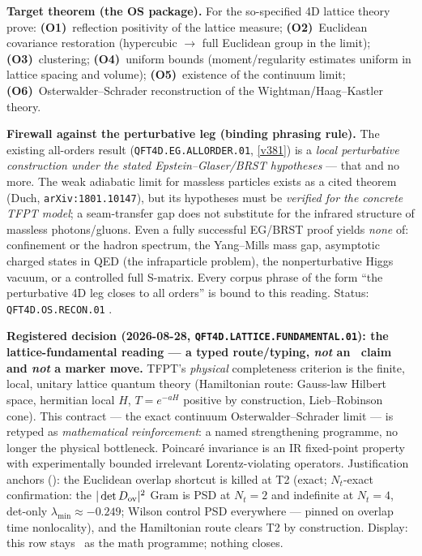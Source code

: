 \documentclass[11pt,a4paper]{article}
\begin{document}
\par\smallskip\noindent\textbf{Target theorem (the OS package).}  For the so-specified 4D
lattice theory prove: \textbf{(O1)}~reflection positivity of the lattice measure;
\textbf{(O2)}~Euclidean covariance restoration (hypercubic $\to$ full Euclidean group in the
limit); \textbf{(O3)}~clustering; \textbf{(O4)}~uniform bounds (moment/regularity estimates
uniform in lattice spacing and volume); \textbf{(O5)}~existence of the continuum limit;
\textbf{(O6)}~Osterwalder--Schrader reconstruction of the Wightman/Haag--Kastler theory.

\par\smallskip\noindent\textbf{Firewall against the perturbative leg (binding phrasing rule).}
The existing all-orders result (\texttt{QFT4D.EG.ALLORDER.01}, \vref{v381}) is a \emph{local
perturbative construction under the stated Epstein--Glaser/BRST hypotheses} --- that and no
more.  The weak adiabatic limit for massless particles exists as a cited theorem (Duch,
\texttt{arXiv:1801.10147}), but its hypotheses must be \emph{verified for the concrete TFPT
model}; a seam-transfer gap does not substitute for the infrared structure of massless
photons/gluons.  Even a fully successful EG/BRST proof yields \emph{none} of: confinement or the
hadron spectrum, the Yang--Mills mass gap, asymptotic charged states in QED (the infraparticle
problem), the nonperturbative Higgs vacuum, or a controlled full S-matrix.  Every corpus phrase
of the form ``the perturbative 4D leg closes to all orders'' is bound to this reading.
Status: \texttt{QFT4D.OS.RECON.01} \mO.

\par\smallskip\noindent\textbf{Registered decision (2026-08-28,
\texttt{QFT4D.LATTICE.FUNDAMENTAL.01}): the lattice-fundamental reading --- a typed
route/typing, \emph{not} an \mE\ claim and \emph{not} a marker move.}
TFPT's \emph{physical} completeness criterion is the finite, local, unitary lattice quantum
theory (Hamiltonian route: Gauss-law Hilbert space, hermitian local $H$, $T=e^{-aH}$ positive
by construction, Lieb--Robinson cone).  This contract --- the exact continuum
Osterwalder--Schrader limit --- is retyped as \emph{mathematical reinforcement}: a named
strengthening programme, no longer the physical bottleneck.  Poincar\'e invariance is an IR
fixed-point property with experimentally bounded irrelevant Lorentz-violating operators.
Justification anchors ():
the Euclidean overlap shortcut is killed at T2 (exact; $N_t$-exact confirmation: the
$|\det D_{\rm ov}|^2$ Gram is PSD at $N_t=2$ and indefinite at $N_t=4$, det-only
$\lambda_{\min}\approx-0.249$; Wilson control PSD everywhere --- pinned on overlap time
nonlocality), and the Hamiltonian route clears T2 by construction.  Display: this row stays
\mO\ as the math programme; nothing closes.
\end{document}
